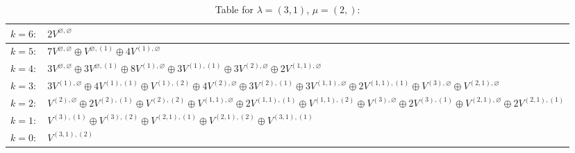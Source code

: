 \renewcommand{\arraystretch}{1.6} 
\begin{table}[H]
\centering
\caption{Table for $\lambda = (3, 1)$, $\mu = (2,)$:}
\begin{tabular}{|>{\centering\arraybackslash}p{15cm}|}
\hline
 $k = 6: \quad 2 V^{\varnothing, \varnothing} $ \\ \hline
 $k = 5: \quad 7 V^{\varnothing, \varnothing} \oplus V^{\varnothing, (1)} \oplus 4 V^{(1), \varnothing} $ \\ \hline
 $k = 4: \quad 3 V^{\varnothing, \varnothing} \oplus 3 V^{\varnothing, (1)} \oplus 8 V^{(1), \varnothing} \oplus 3 V^{(1), (1)} \oplus 3 V^{(2), \varnothing} \oplus 2 V^{(1, 1), \varnothing} $ \\ \hline
 $k = 3: \quad 3 V^{(1), \varnothing} \oplus 4 V^{(1), (1)} \oplus V^{(1), (2)} \oplus 4 V^{(2), \varnothing} \oplus 3 V^{(2), (1)} \oplus 3 V^{(1, 1), \varnothing} \oplus 2 V^{(1, 1), (1)} \oplus V^{(3), \varnothing} \oplus V^{(2, 1), \varnothing} $ \\ \hline
 $k = 2: \quad V^{(2), \varnothing} \oplus 2 V^{(2), (1)} \oplus V^{(2), (2)} \oplus V^{(1, 1), \varnothing} \oplus 2 V^{(1, 1), (1)} \oplus V^{(1, 1), (2)} \oplus V^{(3), \varnothing} \oplus 2 V^{(3), (1)} \oplus V^{(2, 1), \varnothing} \oplus 2 V^{(2, 1), (1)} $ \\ \hline
 $k = 1: \quad V^{(3), (1)} \oplus V^{(3), (2)} \oplus V^{(2, 1), (1)} \oplus V^{(2, 1), (2)} \oplus V^{(3, 1), (1)} $ \\ \hline
 $k = 0: \quad V^{(3, 1), (2)} $ \\ \hline
\end{tabular}
\end{table}

